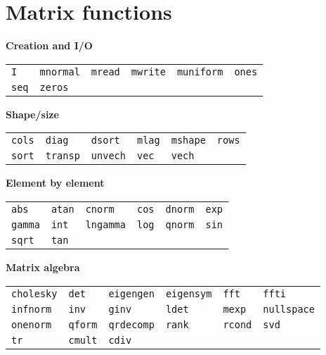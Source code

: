 \section{Matrix functions}
\label{matrix-func}

\newlength{\cwid}
\setlength{\cwid}{0.1\textwidth}

\begin{table}[htbp]
\centering
\textbf{Creation and I/O}
\hrulefill

\begin{tabular}{p{\cwid}p{\cwid}p{\cwid}p{\cwid}p{\cwid}p{\cwid}}
\texttt{I}         &
\texttt{mnormal}   &
\texttt{mread}     &
\texttt{mwrite}    &
\texttt{muniform}  &
\texttt{ones}      \\
\texttt{seq}       &
\texttt{zeros}     
\end{tabular}      

\textbf{Shape/size}
\hrulefill

\begin{tabular}{p{\cwid}p{\cwid}p{\cwid}p{\cwid}p{\cwid}p{\cwid}}
\texttt{cols}      &
\texttt{diag}      &
\texttt{dsort}     &
\texttt{mlag}      &
\texttt{mshape}    &
\texttt{rows}      \\
\texttt{sort}      &
\texttt{transp}    &
\texttt{unvech}    &
\texttt{vec}       &
\texttt{vech}      
\end{tabular}      

\textbf{Element by element}
\hrulefill

\begin{tabular}{p{\cwid}p{\cwid}p{\cwid}p{\cwid}p{\cwid}p{\cwid}}
\texttt{abs}       &
\texttt{atan}      &
\texttt{cnorm}     &
\texttt{cos}       &
\texttt{dnorm}     &
\texttt{exp}       \\
\texttt{gamma}     &
\texttt{int}       &
\texttt{lngamma}   &
\texttt{log}       &
\texttt{qnorm}     &
\texttt{sin}       \\
\texttt{sqrt}      &
\texttt{tan}       
\end{tabular}      

\textbf{Matrix algebra}
\hrulefill

\begin{tabular}{p{\cwid}p{\cwid}p{\cwid}p{\cwid}p{\cwid}p{\cwid}}
\texttt{cholesky}  &
\texttt{det}       &
\texttt{eigengen}  &
\texttt{eigensym}  &
\texttt{fft}       &
\texttt{ffti}      \\
\texttt{infnorm}   &
\texttt{inv}       &
\texttt{ginv}      &
\texttt{ldet}      &
\texttt{mexp}      &
\texttt{nullspace} \\
\texttt{onenorm}   &
\texttt{qform}     &
\texttt{qrdecomp}  &
\texttt{rank}      &
\texttt{rcond}     &
\texttt{svd}       \\
\texttt{tr}        &
\texttt{cmult}     &
\texttt{cdiv}      
\end{tabular}      


\end{table}
